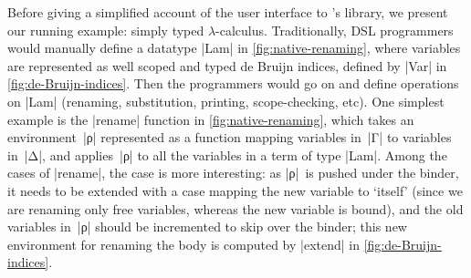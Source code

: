 \documentclass[sigplan,review,fleqn]{acmart}
\renewcommand{\verb}{\collectverb{\color{AgdaFunction}}}
\newcommand{\name}{\collectverb{\it}}
\begin{document}
Before giving a simplified account of the user interface to \citeauthor{Allais-generic-syntax}'s library, we present our running example: simply typed $\lambda$-calculus.
Traditionally, DSL programmers would manually define a datatype \verb|Lam| in \cref{fig:native-renaming}, where variables are represented as well scoped and typed de Bruijn indices, defined by \verb|Var| in \cref{fig:de-Bruijn-indices}.
Then the programmers would go on and define operations on \verb|Lam| (renaming, substitution, printing, scope-checking, etc).
One simplest example is the \verb|rename| function in \cref{fig:native-renaming}, which takes an environment~\name|ρ| represented as a function mapping variables in~\name|Γ|\/ to variables in~\name|Δ|, and applies~\name|ρ| to all the variables in a term of type \verb|Lam|.
Among the cases of \verb|rename|, the  case is more interesting: as \name|ρ|~is pushed under the binder, it needs to be extended with a case mapping the new variable  to `itself' (since we are renaming only free variables, whereas the new variable is bound), and the old variables in~\name|ρ| should be incremented to skip over the binder; this new environment for renaming the body is computed by \verb|extend| in \cref{fig:de-Bruijn-indices}.
\end{document}
